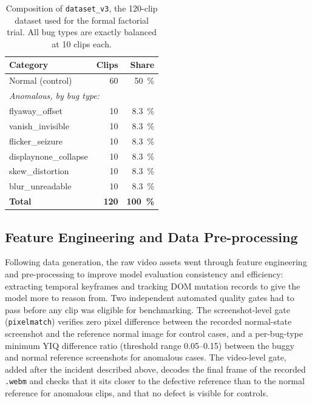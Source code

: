 \begin{table}[htbp]
\centering
\caption[Composition of the formal-trial dataset]{Composition of \texttt{dataset\_v3}, the 120-clip dataset used for the formal factorial trial. All bug types are exactly balanced at 10 clips each.}
\label{tab:dataset-composition}
\begin{tabular}{@{}lrr@{}}
\toprule
Category & Clips & Share \\
\midrule
Normal (control) & 60 & \SI{50}{\percent} \\
\midrule
\multicolumn{3}{l}{\emph{Anomalous, by bug type:}} \\
flyaway\_offset       & 10 & \SI{8.3}{\percent} \\
vanish\_invisible     & 10 & \SI{8.3}{\percent} \\
flicker\_seizure      & 10 & \SI{8.3}{\percent} \\
displaynone\_collapse & 10 & \SI{8.3}{\percent} \\
skew\_distortion      & 10 & \SI{8.3}{\percent} \\
blur\_unreadable      & 10 & \SI{8.3}{\percent} \\
\midrule
\textbf{Total} & \textbf{120} & \textbf{\SI{100}{\percent}} \\
\bottomrule
\end{tabular}
\end{table}

\subsection{Feature Engineering and Data Pre-processing}
\label{sec:data_prep-qg}
Following data generation, the raw video assets went through feature engineering and pre-processing to improve model evaluation consistency and efficiency: extracting temporal keyframes and tracking DOM mutation records to give the model more to reason from. Two independent automated quality gates had to pass before any clip was eligible for benchmarking. The screenshot-level gate (\texttt{pixelmatch}) verifies zero pixel difference between the recorded normal-state screenshot and the reference normal image for control cases, and a per-bug-type minimum YIQ difference ratio (threshold range \numrange{0.05}{0.15}) between the buggy and normal reference screenshots for anomalous cases. The video-level gate, added after the incident described above, decodes the final frame of the recorded \texttt{.webm} and checks that it sits closer to the defective reference than to the normal reference for anomalous clips, and that no defect is visible for controls.

